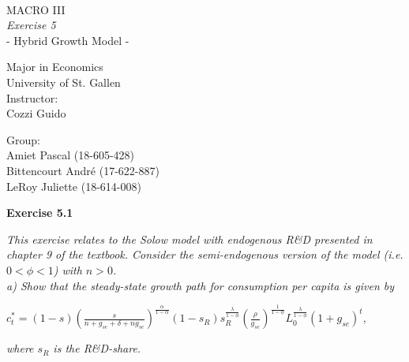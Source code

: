 \documentclass[11pt]{article} %
\begin{document}
\thispagestyle{empty}
\ \vspace{1.0cm}
\begin{center}
{\LARGE
MACRO III \\
\textit{Exercise 5} \\
{\small - Hybrid Growth Model -}\\[2cm]
}

{
Major in Economics \\
{University of St. Gallen} \\ [2cm]
Instructor:\\
Cozzi Guido \\[2cm]
}

{
Group:\\
Amiet Pascal (18-605-428)\\
Bittencourt André (17-622-887)\\
LeRoy Juliette (18-614-008)\\
}
\end{center}

\pagebreak

\textbf{\Large{Exercise 5.1}}

\textit{This exercise relates to the Solow model with endogenous R\&D presented in chapter 9 of the textbook. Consider the semi-endogenous version of the model (i.e. $0 < \phi < 1$) with $n > 0$.}\\

\textit{a) Show that the steady-state growth path for consumption per capita is given by}
\begin{center}
    $c_t^* = (1-s)\left(\frac{s}{n+g_{se}+\delta+ng_{se}}\right)^{\frac{\alpha}{1-\alpha}}(1-s_{R})s_R^{\frac{\lambda}{1-\phi}}\left(\frac{\rho}{g_{se}} \right)^{\frac{1}{1-\phi}}L_0^{\frac{\lambda}{1-\phi}}(1+g_{se})^t$,
\end{center}
\textit{where $s_R$ is the R\&D-share.}\par
\end{document}
